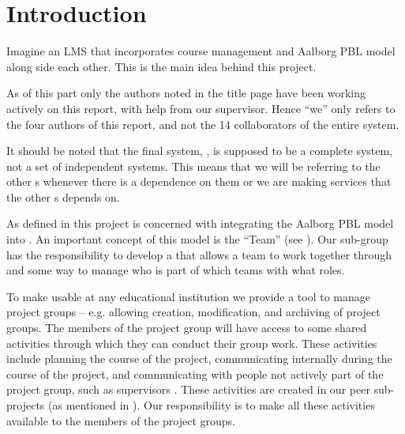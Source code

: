 \chapter{Introduction}
\label{chap:introProjectgroup}
Imagine an LMS that incorporates course management and Aalborg PBL model along side each other.
This is the main idea behind this project.

As of this part only the authors noted in the title page have been working actively on this report, with help from our supervisor.
Hence ``we'' only refers to the four authors of this report, and not the 14 collaborators of the entire system.

It should be noted that the final system, \system{}, is supposed to be a complete system, not a set of independent systems.
This means that we will be referring to the other \subsystem{}s whenever there is a dependence on them or we are making services that the other \subsystem{}s depends on.



As defined in  this project is concerned with integrating the Aalborg PBL model into \moodle.
An important concept of this model is the ``Team'' (see ).
Our sub-group has the responsibility to develop a \subsystem{} that allows a team to work together through \moodle{} and some way to manage who is part of which teams with what roles.






To make \system{} usable at any educational institution we provide a tool to manage project groups -- e.g. allowing creation, modification, and archiving of project groups.
The members of the project group will have access to some shared activities through which they can conduct their group work.
These activities include planning the course of the project, communicating internally during the course of the project, and communicating with people not actively part of the project group, such as supervisors .
These activities are created in our peer sub-projects (as mentioned in ).
Our responsibility is to make all these activities available to the members of the project groups.




